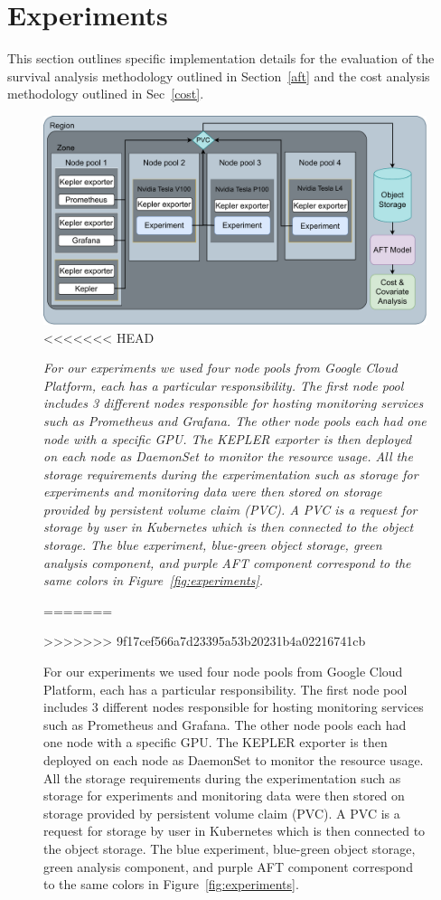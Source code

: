 \documentclass[sn-mathphys-num]{sn-jnl}%
\newcommand{\cm}[1]{\textit{{\color{blue}#1}}}
\begin{document}
\section{Experiments}
\label{experiments}

This section outlines specific implementation details for the evaluation of the survival analysis methodology outlined in Section~\ref{aft} and the cost analysis methodology outlined in Sec~\ref{cost}.


\begin{figure}
    \centering
    \includegraphics[width=.9\textwidth]{plots/architecture.pdf}
<<<<<<< HEAD
    \caption{\cm{For our experiments we used four node pools from Google Cloud Platform, each has a particular responsibility. The first node pool includes 3 different nodes responsible for hosting monitoring services such as Prometheus and Grafana.
    The other node pools each had one node with a specific GPU\@.
    The KEPLER exporter is then deployed on each node as DaemonSet to monitor the resource usage.
    All the storage requirements during the experimentation such as storage for experiments and monitoring data were then stored on storage provided by persistent volume claim (PVC).
    A PVC is a request for storage by user in Kubernetes which is then connected to the object storage.
    The blue experiment, blue-green object storage, green analysis component, and purple AFT component correspond to the same colors in Figure~\ref{fig:experiments}.}}
=======
    \caption{
    For our experiments we used four node pools from Google Cloud Platform, each has a particular responsibility. 
    The first node pool includes 3 different nodes responsible for hosting monitoring services such as Prometheus and Grafana. 
    The other node pools each had one node with a specific GPU.  The KEPLER exporter is then deployed on each node as DaemonSet to monitor the resource usage. 
    All the storage requirements during the experimentation such as storage for experiments and monitoring data were then stored on storage provided by persistent volume claim (PVC). 
    A PVC is a request for storage by user in Kubernetes which is then connected to the object storage. 
    The blue experiment, blue-green object storage, green analysis component, and purple AFT component correspond to the same colors in Figure~\ref{fig:experiments}.}
>>>>>>> 9f17cef566a7d23395a53b20231b4a02216741cb
    \label{fig:architecture}
\end{figure}
\end{document}
